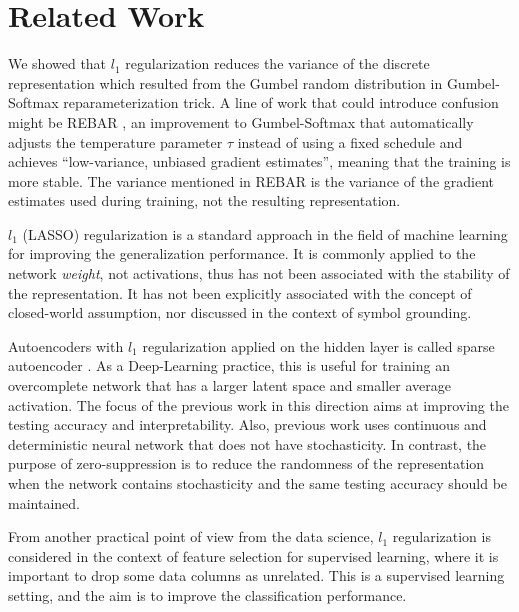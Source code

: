 \section{Related Work}


We showed that $l_1$ regularization reduces the variance of the discrete
representation which resulted from the Gumbel random distribution
in Gumbel-Softmax reparameterization
trick.  A line of work that could introduce confusion might be REBAR
\cite{TuckerMMLS17}, an improvement to Gumbel-Softmax that automatically
adjusts the temperature parameter $\tau$ instead of using a fixed
schedule and achieves ``low-variance, unbiased gradient estimates'',
meaning that the training is more stable. The variance mentioned in
REBAR is the variance of the gradient estimates used during training, not the
resulting representation.




$l_1$ (LASSO) regularization is a standard approach in the field of machine learning for improving the
generalization performance.
It is commonly applied to the network \emph{weight}, not activations,
thus has not been associated with the stability of the representation.
It has not been explicitly associated with the concept of
closed-world assumption, nor discussed in the context of symbol grounding.

Autoencoders with $l_1$ regularization applied on the hidden layer
is called sparse autoencoder \cite{ng2011cs294a}.
As a Deep-Learning practice,
this is useful for training an overcomplete network that has a larger latent space and smaller average activation.
The focus of the previous work in this direction aims at improving the testing accuracy and interpretability.
Also, previous work uses continuous and deterministic neural network that does not have stochasticity.
In contrast, the purpose of zero-suppression is to reduce the randomness of the representation
when the network contains stochasticity and the same testing accuracy should be maintained.

From another practical point of view from the data science,
$l_1$ regularization is considered in the context of feature selection for supervised learning,
where it is important to drop some data columns as unrelated.
This is a supervised learning setting, and the aim is to improve the classification performance.

